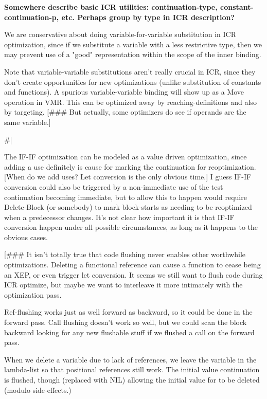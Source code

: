{\bf Somewhere describe basic ICR utilities: continuation-type,
constant-continuation-p, etc.  Perhaps group by type in ICR description?}

We are conservative about doing variable-for-variable substitution in ICR
optimization, since if we substitute a variable with a less restrictive type,
then we may prevent use of a "good" representation within the scope of the
inner binding.

Note that variable-variable substitutions aren't really crucial in ICR, since
they don't create opportunities for new optimizations (unlike substitution of
constants and functions).  A spurious variable-variable binding will show up as
a Move operation in VMR.  This can be optimized away by reaching-definitions
and also by targeting.  [\#\#\# But actually, some optimizers do see if operands
are the same variable.]

\#|

The IF-IF optimization can be modeled as a value driven optimization, since
adding a use definitely is cause for marking the continuation for
reoptimization.  [When do we add uses?  Let conversion is the only obvious
time.]  I guess IF-IF conversion could also be triggered by a non-immediate use
of the test continuation becoming immediate, but to allow this to happen would
require Delete-Block (or somebody) to mark block-starts as needing to be
reoptimized when a predecessor changes.  It's not clear how important it is
that IF-IF conversion happen under all possible circumstances, as long as it
happens to the obvious cases.

[\#\#\# It isn't totally true that code flushing never enables other worthwhile
optimizations.  Deleting a functional reference can cause a function to cease
being an XEP, or even trigger let conversion.  It seems we still want to flush
code during ICR optimize, but maybe we want to interleave it more intimately
with the optimization pass.  

Ref-flushing works just as well forward as backward, so it could be done in the
forward pass.  Call flushing doesn't work so well, but we could scan the block
backward looking for any new flushable stuff if we flushed a call on the
forward pass.

When we delete a variable due to lack of references, we leave the variable
in the lambda-list so that positional references still work.  The initial value
continuation is flushed, though (replaced with NIL) allowing the initial value
for to be deleted (modulo side-effects.)

